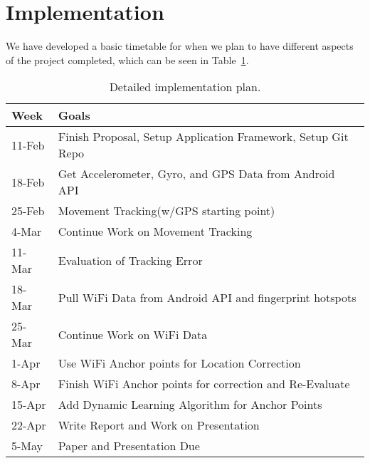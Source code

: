 \section{Implementation}
We have developed a basic timetable for when we plan to have different aspects of the project completed, which can be seen in Table~\ref{table:table1}.

\begin{table}
\begin{tabular}{|p{1.5cm}|p{6cm}|}\hline
\textbf{Week} & \textbf{Goals} \\ \hline
11-Feb & Finish Proposal, Setup Application Framework, Setup Git Repo\\ \hline
18-Feb & Get Accelerometer, Gyro, and GPS Data from Android API\\ \hline
25-Feb & Movement Tracking(w/GPS starting point)\\ \hline
4-Mar & Continue Work on Movement Tracking\\ \hline
11-Mar & Evaluation of Tracking Error \\ \hline
18-Mar & Pull WiFi Data from Android API and fingerprint hotspots\\ \hline
25-Mar & Continue Work on WiFi Data\\ \hline
1-Apr & Use WiFi Anchor points for Location Correction\\ \hline
8-Apr & Finish WiFi Anchor points for correction and Re-Evaluate\\ \hline
15-Apr & Add Dynamic Learning Algorithm for Anchor Points\\ \hline
22-Apr & Write Report and Work on Presentation\\ \hline
5-May & Paper and Presentation Due\\ \hline
\end{tabular}
\caption{Detailed implementation plan.}\label{table:table1}
\end{table}